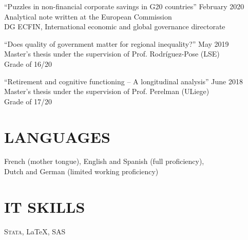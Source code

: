 \documentclass[margin,a4paper]{res}
\begin{document}
\begin{resume}
		``Puzzles in non-financial corporate savings in G20 countries'' \hfill February 2020 \\
		Analytical note written at the European Commission\\
		DG ECFIN, International economic and global governance directorate

 
		``Does quality of government matter for regional inequality?''	 \hfill	May 2019 \\
		Master's thesis under the supervision of Prof. Rodríguez-Pose (LSE) \\
		Grade of 16/20 %
		
		
		

		``Retirement and cognitive functioning -- A longitudinal analysis''	 \hfill	June 2018 \\
		Master's thesis under the supervision of Prof. Perelman (ULiege)\\
		Grade of 17/20


 
 
\section{LANGUAGES} French (mother tongue), English and Spanish (full proficiency),\\ Dutch and German (limited working proficiency)
                

 \section{IT SKILLS} \textsc{Stata}, \LaTeX, SAS




\end{resume}
\end{document}
